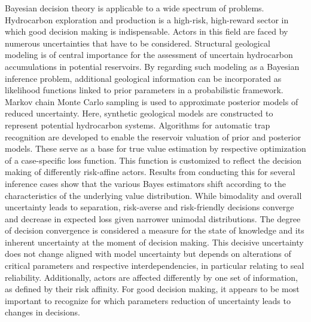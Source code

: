 \documentclass[a4paper,11pt]{MScThesis}
\begin{document}
%
\frontmatter %
%
    \maketitle
%


\cleardoublepage



Bayesian decision theory is applicable to a wide spectrum of problems. Hydrocarbon exploration and production is a high-risk, high-reward sector in which good decision making is indispensable. Actors in this field are faced by numerous uncertainties that have to be considered. Structural geological modeling is of central importance for the assessment of uncertain hydrocarbon accumulations in potential reservoirs. By regarding such modeling as a Bayesian inference problem, additional geological information can be incorporated as likelihood functions linked to prior parameters in a probabilistic framework. Markov chain Monte Carlo sampling is used to approximate posterior models of reduced uncertainty. Here, synthetic geological models are constructed to represent potential hydrocarbon systems. Algorithms for automatic trap recognition are developed to enable the reservoir valuation of prior and posterior models. These serve as a base for true value estimation by respective optimization of a case-specific loss function. This function is customized to reflect the decision making of differently risk-affine actors. Results from conducting this for several inference cases show that the various Bayes estimators shift according to the characteristics of the underlying value distribution. While bimodality and overall uncertainty leads to separation, risk-averse and risk-friendly decisions converge and decrease in expected loss given narrower unimodal distributions. The degree of decision convergence is considered a measure for the state of knowledge and its inherent uncertainty at the moment of decision making. This decisive uncertainty does not change aligned with model uncertainty but depends on alterations of critical parameters and respective interdependencies, in particular relating to seal reliability. Additionally, actors are affected differently by one set of information, as defined by their risk affinity. For good decision making, it appears to be most important to recognize for which parameters reduction of uncertainty leads to changes in decisions.
\end{document}
